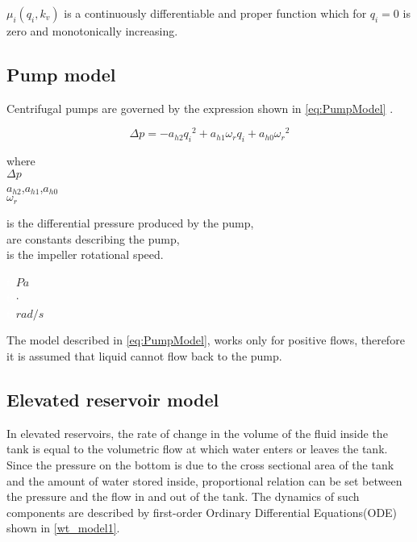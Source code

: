 $\mu_i(q_i,k_v)$ is a continuously differentiable and proper function which for $q_i = 0$ is zero and monotonically increasing.

\subsection{Pump model}
\label{pump_component}

Centrifugal pumps are governed by the expression shown in \eqref{eq:PumpModel} \cite{kallesoePHD}.

\begin{equation}
  \Delta p = -a_{h2}{q_i}^2 + a_{h1} \omega_r q_i + a_{h0}{\omega_r}^2
  \label{eq:PumpModel}
\end{equation}

\begin{minipage}[t]{0.20\textwidth}
where\\
\hspace*{8mm} $\Delta p$ \\
\hspace*{8mm} $a_{h2}$,$a_{h1}$,$a_{h0}$ \\
\hspace*{8mm} $\omega_r$ 

\end{minipage}
\begin{minipage}[t]{0.68\textwidth}
\vspace*{2mm}
is the differential pressure produced by the pump,\\
are constants describing the pump,\\
is the impeller rotational speed.
\end{minipage}
\begin{minipage}[t]{0.10\textwidth}
\vspace*{2mm}
\textcolor{White}{te}$\unit{Pa}$\\
\textcolor{White}{te}$\unit{\cdot}$\\
\textcolor{White}{te}$\unit{rad/s}$
\end{minipage}  

The model described in \eqref{eq:PumpModel}, works only for positive flows, therefore it is assumed that liquid cannot flow back to the pump. 

\subsection{Elevated reservoir model}
\label{elevatedreservoir_component}

In elevated reservoirs, the rate of change in the volume of the fluid inside the tank is equal to the volumetric flow at which water enters or leaves the tank. Since the pressure on the bottom is due to the cross sectional area of the tank and the amount of water stored inside, proportional relation can be set between the pressure and the flow in and out of the tank. The dynamics of such components are described by first-order Ordinary Differential Equations(ODE) shown in \eqref{wt_model1}.

